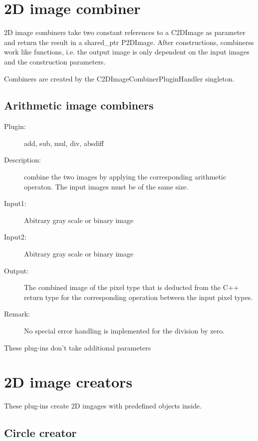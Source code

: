 \section{2D image combiner}  \label{sec:combiner2d}
  
  2D image combiners take two constant references to a C2DImage as parameter and 
  return the result in a shared\_ptr P2DImage. 
  After constructions, combinerss work like functions, i.e. the output image is only dependent 
  on the input images and the construction parameters. 

  Combiners are created by the C2DImageCombinerPluginHandler singleton. 

   
   \subsection{Arithmetic image combiners}
   \label{combiner2d:aritmetic}
   
   \begin{description}
   
   \item [Plugin:] add, sub, mul, div, absdiff
   \item [Description:] combine the two images by applying the corresponding arithmetic operaton. 
   The input images must be of the same size. 
   \item [Input1:] Abitrary gray scale or binary image 
   \item [Input2:] Abitrary gray scale or binary image 
   \item [Output:] The combined image of the pixel type that is deducted from the 
                   C++ return type for the corresponding operation between the input pixel types.
   \item [Remark:] No special error handling is implemented for the division by zero.  
   \end{description}
   These plug-ins don't take additional parameters

\section{2D image creators}  \label{sec:creator2d}
  
  These plug-ins create 2D imgages with predefined objects inside. 


  \subsection{Circle creator}
  \label{creator2d:circle}
   

